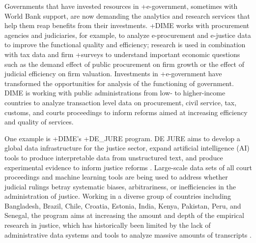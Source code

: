 \documentclass[
]{book}
\begin{document}
Governments that have invested resources in +e-government\textbar, sometimes with World Bank support, are now demanding the analytics and research services that help them reap benefits from their investments. +DIME\textbar{} works with procurement agencies and judiciaries, for example, to analyze e-procurement and e-justice data to improve the functional quality and efficiency; research is used in combination with tax data and firm +surveys\textbar{} to understand important economic questions such as the demand effect of public procurement on firm growth or the effect of judicial efficiency on firm valuation. Investments in +e-government\textbar{} have transformed the opportunities for analysis of the functioning of government. DIME is working with public administrations from low- to higher-income countries to analyze transaction level data on procurement, civil service, tax, customs, and courts proceedings to inform reforms aimed at increasing efficiency and quality of services.

One example is +DIME's\textbar{} +DE\_JURE\textbar{} program. DE JURE aims to develop a global data infrastructure for the justice sector, expand artificial intelligence (AI) tools to produce interpretable data from unstructured text, and produce experimental evidence to inform justice reforms \citep{ash2018}. Large-scale data sets of all court proceedings and machine learning tools are being used to address whether judicial rulings betray systematic biases, arbitrariness, or inefficiencies in the administration of justice\emph{.} Working in a diverse group of countries including Bangladesh, Brazil, Chile, Croatia, Estonia, India, Kenya, Pakistan, Peru, and Senegal, the program aims at increasing the amount and depth of the empirical research in justice, which has historically been limited by the lack of administrative data systems and tools to analyze massive amounts of transcripts \citep[see][]{kondylis2019}.
\end{document}
